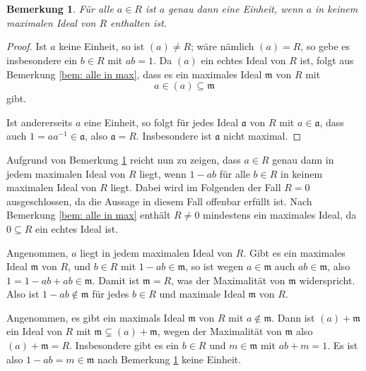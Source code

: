 \documentclass[a4paper,10pt]{article}
\newcounter{satze}
\newtheorem{bem}[satze]{Bemerkung}
\newcommand{\mf}[1]{\mathfrak{#1}}
\begin{document}
\section{}\label{sec: alternative definition J(R)}

\begin{bem}\label{bem: einheiten und maximale ideale}
 Für alle $a \in R$ ist $a$ genau dann eine Einheit, wenn $a$ in keinem maximalen Ideal von $R$ enthalten ist.
\end{bem}
\begin{proof}
 Ist $a$ keine Einheit, so ist $(a) \neq R$; wäre nämlich $(a) = R$, so gebe es insbesondere ein $b \in R$ mit $ab=1$. Da $(a)$ ein echtes Ideal von $R$ ist, folgt aus Bemerkung \ref{bem: alle in max}, dass es ein maximales Ideal $\mf{m}$ von $R$ mit
 \[
  a \in (a) \subseteq \mf{m}
 \]
 gibt.

 Ist andererseits $a$ eine Einheit, so folgt für jedes Ideal $\mf{a}$ von $R$ mit $a \in \mf{a}$, dass auch $1 = aa^{-1} \in \mf{a}$, also $\mf{a} = R$. Insbesondere ist $\mf{a}$ nicht maximal.
\end{proof}

Aufgrund von Bemerkung \ref{bem: einheiten und maximale ideale} reicht nun zu zeigen, dass $a \in R$ genau dann in jedem maximalen Ideal von $R$ liegt, wenn $1-ab$ für alle $b \in R$ in keinem maximalen Ideal von $R$ liegt. Dabei wird im Folgenden der Fall $R=0$ ausgeschlossen, da die Aussage in diesem Fall offenbar erfüllt ist. Nach Bemerkung \ref{bem: alle in max} enthält $R \neq 0$ mindestens ein maximales Ideal, da $0 \subseteq R$ ein echtes Ideal ist.

Angenommen, $a$ liegt in jedem maximalen Ideal von $R$. Gibt es ein maximales Ideal $\mf{m}$ von $R$, und $b \in R$ mit $1-ab \in \mf{m}$, so ist wegen $a \in \mf{m}$ auch $ab \in \mf{m}$, also $1 = 1-ab + ab \in \mf{m}$. Damit ist $\mf{m} = R$, was der Maximalität von $\mf{m}$ widerspricht. Also ist $1-ab \not\in \mf{m}$ für jedes $b \in R$ und maximale Ideal $\mf{m}$ von $R$.

Angenommen, es gibt ein maximals Ideal $\mf{m}$ von $R$ mit $a \not\in \mf{m}$. Dann ist $(a) + \mf{m}$ ein Ideal von $R$ mit $\mf{m} \subsetneq (a) + \mf{m}$, wegen der Maximalität von $\mf{m}$ also $(a) + \mf{m} = R$. Insbesondere gibt es ein $b \in R$ und $m \in \mf{m}$ mit $ab+m = 1$. Es ist also $1-ab = m \in \mf{m}$ nach Bemerkung \ref{bem: einheiten und maximale ideale} keine Einheit.
\end{document}
